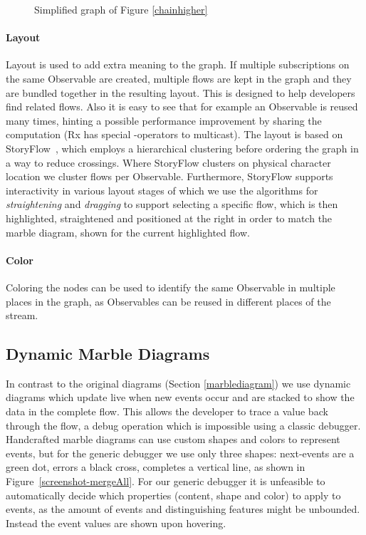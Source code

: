 \begin{figure}[ht]
	\centering
	
	\caption{Simplified graph of Figure \ref{chainhigher}}
	\label{fiddlehigher}
\end{figure}

\paragraph{Layout} Layout is used to add extra meaning to the graph. If multiple subscriptions on the same Observable are created, multiple flows are kept in the graph and they are bundled together in the resulting layout. This is designed to help developers find related flows. Also it is easy to see that for example an Observable is reused many times, hinting a possible performance improvement by sharing the computation (Rx has special -operators to multicast). The layout is based on StoryFlow~\cite{liu2013storyflow}, which employs a hierarchical clustering before ordering the graph in a way to reduce crossings. Where StoryFlow clusters on physical character location we cluster flows per Observable. Furthermore, StoryFlow supports interactivity in various layout stages of which we use the algorithms for \emph{straightening} and \emph{dragging} to support selecting a specific flow, which is then highlighted, straightened and positioned at the right in order to match the marble diagram, shown for the current highlighted flow.

\paragraph{Color} Coloring the nodes can be used to identify the same Observable in multiple places in the graph, as Observables can be reused in different places of the stream.

\subsection{Dynamic Marble Diagrams}
In contrast to the original diagrams (Section \ref{marblediagram}) we use dynamic diagrams which update live when new events occur and are stacked to show the data in the complete flow. This allows the developer to trace a value back through the flow, a debug operation which is impossible using a classic debugger. Handcrafted marble diagrams can use custom shapes and colors to represent events, but for the generic debugger we use only three shapes: next-events are a green dot, errors a black cross, completes a vertical line, as shown in Figure~\ref{screenshot-mergeAll}. For our generic debugger it is unfeasible to automatically decide which properties (content, shape and color) to apply to events, as the amount of events and distinguishing features might be unbounded. Instead the event values are shown upon hovering.

